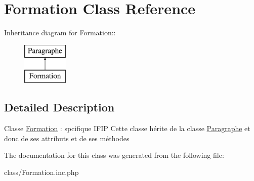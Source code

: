 \hypertarget{class_formation}{
\section{Formation Class Reference}
\label{class_formation}
}
Inheritance diagram for Formation::\begin{figure}[H]
\begin{center}
\leavevmode
\includegraphics[height=2cm]{class_formation}
\end{center}
\end{figure}


\subsection{Detailed Description}
Classe \hyperlink{class_formation}{Formation} : spcifique IFIP Cette classe hérite de la classe \hyperlink{class_paragraphe}{Paragraphe} et donc de ses attributs et de ses méthodes 

The documentation for this class was generated from the following file:\begin{DoxyCompactItemize}
\item 
class/Formation.inc.php\end{DoxyCompactItemize}
